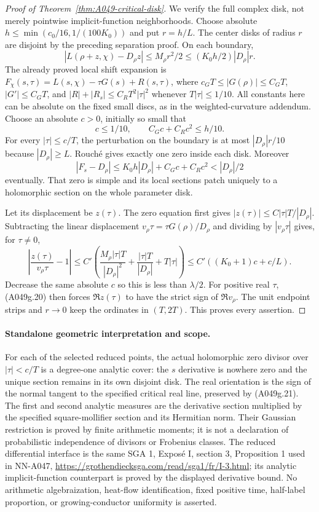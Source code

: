 \begin{proof}[Proof of Theorem~\ref{thm:A049-critical-disk}]
We verify the full complex disk, not merely pointwise
implicit-function neighborhoods. Choose absolute
$h\le\min(c_0/16,1/(100K_0))$ and put $r=h/L$.
The center disks of radius $r$ are disjoint by the preceding
separation proof. On each boundary,
\[
 |L(\rho+z,\chi)-D_\rho z|
      \le M_\rho r^2/2\le(K_0h/2)|D_\rho|r.
\]
The already proved local shift expansion is
$F_\chi(s,\tau)=L(s,\chi)-\tau G(s)+R(s,\tau)$, where
$c_G T\le|G(\rho)|\le C_G T$, $|G'|\le C_GT$, and
$|R|+|R_s|\le C_RT^2|\tau|^2$ whenever $T|\tau|\le1/10$.
All constants here can be absolute on the fixed small discs,
as in the weighted-curvature addendum. Choose an absolute
$c>0$, initially so small that
\[
 c\le1/10,\qquad C_Gc+C_Rc^2\le h/10.
\]
For every $|\tau|\le c/T$, the perturbation on the boundary
is at most $|D_\rho|r/10$ because $|D_\rho|\ge L$.
Rouch\'e gives exactly one zero inside each disk.
Moreover
\[
 |F_s-D_\rho|\le K_0h|D_\rho|+C_Gc+C_Rc^2
                                      <|D_\rho|/2
\]
eventually. That zero is simple and its local sections patch
uniquely to a holomorphic section on the whole parameter disk.

Let its displacement be $z(\tau)$. The zero equation first
gives $|z(\tau)|\le C|\tau|T/|D_\rho|$. Subtracting the
linear displacement $v_\rho\tau=\tau G(\rho)/D_\rho$ and
dividing by $|v_\rho\tau|$ gives, for $\tau\ne0$,
\[
 \left|\frac{z(\tau)}{v_\rho\tau}-1\right|
 \le C'\left(\frac{M_\rho|\tau|T}{|D_\rho|^2}
                    +\frac{|\tau|T}{|D_\rho|}+T|\tau|\right)
 \le C'((K_0+1)c+c/L).
\tag{A049g.21}
\]
Decrease the same absolute $c$ so this is less than
$\lambda/2$. For positive real $\tau$, (A049g.20) then
forces $\Re z(\tau)$ to have the strict sign of
$\Re v_\rho$. The unit endpoint strips and $r\to0$ keep
the ordinates in $(T,2T)$. This proves every assertion.
\end{proof}

\paragraph{Standalone geometric interpretation and scope.}
For each of the selected reduced points, the actual holomorphic
zero divisor over $|\tau|<c/T$ is a degree-one analytic cover:
the $s$ derivative is nowhere zero and the unique section remains
in its own disjoint disk. The real orientation is the sign of
the normal tangent to the specified critical real line, preserved
by (A049g.21). The first and second analytic measures are the
derivative section multiplied by the specified square-mollifier
section and its Hermitian norm. Their Gaussian restriction is
proved by finite arithmetic moments; it is not a declaration
of probabilistic independence of divisors or Frobenius classes.
The reduced differential interface is the same SGA 1, Expos\'e I,
section 3, Proposition 1 used in NN-A047,
\url{https://grothendiecksga.com/read/sga1/fr/I-3.html}; its analytic
implicit-function counterpart is proved by the displayed
derivative bound. No arithmetic algebraization, heat-flow
identification, fixed positive time, half-label proportion,
or growing-conductor uniformity is asserted.

